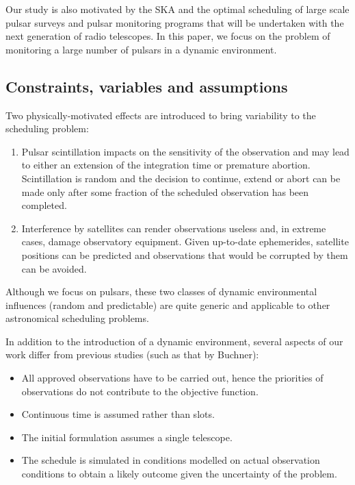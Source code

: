 \documentclass{article}
\begin{document}
Our study is also motivated by the SKA and the optimal scheduling of large scale
pulsar surveys and pulsar monitoring programs that will be undertaken with the next
generation of radio telescopes. In this paper, we focus on the problem of monitoring a
large number of pulsars in a dynamic environment. 

\subsection*{Constraints, variables and assumptions}

Two physically-motivated effects
are introduced to bring variability to the scheduling problem:
\begin{enumerate}
    \item Pulsar scintillation impacts on the sensitivity of the observation and may lead to
    either an extension of the integration time or premature abortion. Scintillation
    is random and the decision to continue, extend or abort can be made only after
    some fraction of the scheduled observation has been completed.
    \item  Interference by satellites can render observations useless and, in extreme cases,
    damage observatory equipment. Given up-to-date ephemerides, satellite positions
    can be predicted and observations that would be corrupted by them can be avoided.
\end{enumerate}

Although we focus on pulsars, these two classes of dynamic environmental 
influences (random and predictable) are quite generic and applicable to 
other astronomical scheduling problems.

In addition to the introduction of a dynamic environment, several aspects of our
work differ from previous studies (such as that by Buchner):

\begin{itemize}
    \item  All approved observations have to be carried out, hence the priorities of
    observations do not contribute to the objective function.
    \item Continuous time is assumed rather than slots.
    \item The initial formulation assumes a single telescope.
    \item  The schedule is simulated in conditions modelled on actual 
    observation conditions to obtain a likely outcome given the uncertainty 
    of the problem.
\end{itemize}
\end{document}
